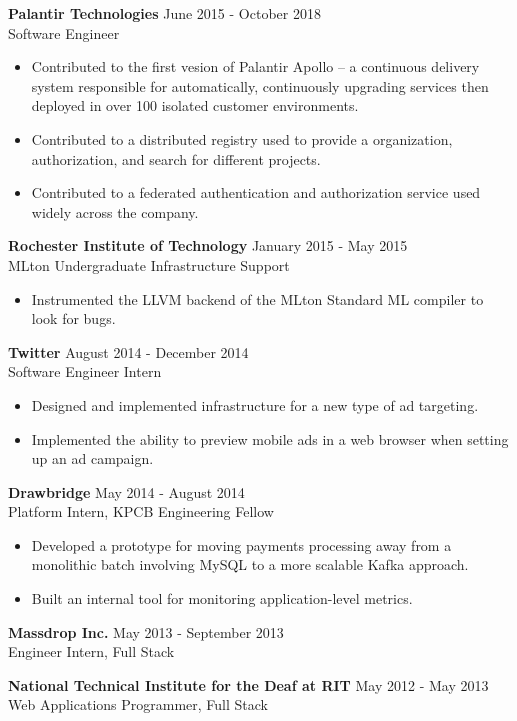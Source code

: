 \documentclass[line,margin]{res}
\begin{document}
\begin{resume}
{\bf Palantir Technologies} \hfill June 2015 - October 2018 \\
Software Engineer
\begin{itemize}
\item Contributed to the first vesion of Palantir Apollo -- a continuous delivery system responsible for automatically, continuously upgrading services then deployed in over 100 isolated customer environments.
\item Contributed to a distributed registry used to provide a organization, authorization, and search for different projects.
\item Contributed to a federated authentication and authorization service used widely across the company.
\end{itemize}

{\bf  Rochester Institute of Technology} \hfill January 2015 - May 2015 \\
MLton Undergraduate Infrastructure Support
\begin{itemize}
\item Instrumented the LLVM backend of the MLton Standard ML compiler to look for bugs.
\end{itemize}

{\bf Twitter} \hfill August 2014 - December 2014 \\
Software Engineer Intern
\begin{itemize}
\item Designed and implemented infrastructure for a new type of ad targeting.
\item Implemented the ability to preview mobile ads in a web browser when setting up an ad campaign.
\end{itemize}

{\bf Drawbridge} \hfill May 2014 - August 2014 \\
Platform Intern, KPCB Engineering Fellow
\begin{itemize}
\item Developed a prototype for moving payments processing away from a monolithic batch involving MySQL to a more scalable Kafka approach.
\item Built an internal tool for monitoring application-level metrics.
\end{itemize}

{\bf Massdrop Inc.} \hfill May 2013 - September 2013\\
Engineer Intern, Full Stack

{\bf  National Technical Institute for the Deaf at RIT} \hfill May 2012 - May 2013\\
Web Applications Programmer, Full Stack

\end{resume}
\end{document}
